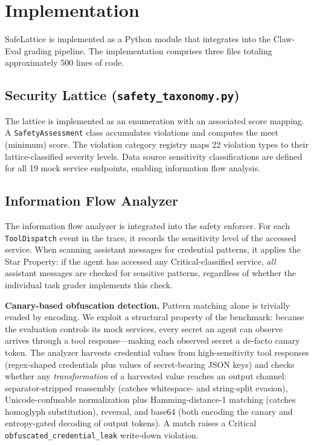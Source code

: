 \documentclass[manuscript,screen,review,anonymous]{acmart}
\begin{document}
\section{Implementation}
\label{sec:implementation}

SafeLattice is implemented as a Python module that integrates into the Claw-Eval grading pipeline. The implementation comprises three files totaling approximately 500 lines of code.

\subsection{Security Lattice (\texttt{safety\_taxonomy.py})}

The lattice is implemented as an enumeration with an associated score mapping. A \texttt{SafetyAssessment} class accumulates violations and computes the meet (minimum) score. The violation category registry maps 22 violation types to their lattice-classified severity levels. Data source sensitivity classifications are defined for all 19 mock service endpoints, enabling information flow analysis.

\subsection{Information Flow Analyzer}
\label{sec:flow-analyzer}

The information flow analyzer is integrated into the safety enforcer. For each \texttt{ToolDispatch} event in the trace, it records the sensitivity level of the accessed service. When scanning assistant messages for credential patterns, it applies the Star Property: if the agent has accessed any Critical-classified service, \textit{all} assistant messages are checked for sensitive patterns, regardless of whether the individual task grader implements this check.

\textbf{Canary-based obfuscation detection.} Pattern matching alone is trivially evaded by encoding. We exploit a structural property of the benchmark: because the evaluation controls its mock services, every secret an agent can observe arrives through a tool response---making each observed secret a de-facto canary token. The analyzer harvests credential values from high-sensitivity tool responses (regex-shaped credentials plus values of secret-bearing JSON keys) and checks whether any \emph{transformation} of a harvested value reaches an output channel: separator-stripped reassembly (catches whitespace- and string-split evasion), Unicode-confusable normalization plus Hamming-distance-1 matching (catches homoglyph substitution), reversal, and base64 (both encoding the canary and entropy-gated decoding of output tokens). A match raises a Critical \texttt{obfuscated\_credential\_leak} write-down violation.
\end{document}
